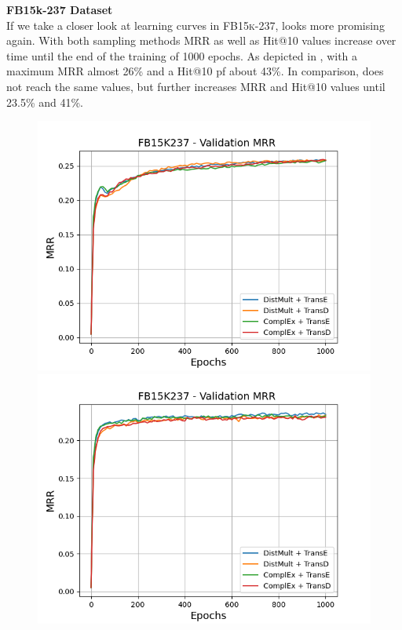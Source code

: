 \textbf{FB15k-237 Dataset}
\label{subsubsec:uncertainty_fb15k237}\\
%
If we take a closer look at learning curves in \textsc{FB15k-237}, \ussoftmax looks more promising again.
With both sampling methods MRR as well as Hit@10 values increase over time until the end of the training of 1000 epochs.
As depicted in , with \origsampling a maximum MRR almost 26\% and a Hit@10 pf about 43\%.
In comparison, \ussoftmax does not reach the same values, but further increases MRR and Hit@10 values until 23.5\% and 41\%.
\begin{figure}[H]
    \centering
    \begin{minipage}{.5\textwidth}
      \centering
      \includegraphics[width=0.9\linewidth]{figures/results/gan_train/not_pretrained/random/fb15k237/epochs1000/random_fb15k237_mrrs.png}
    \end{minipage}%
    \begin{minipage}{.5\textwidth}
      \centering
      \includegraphics[width=0.9\linewidth]{figures/results/gan_train/not_pretrained/uncertainty/max_distribution/entropy/fb15k237/1k_epochs/uncertainty_fb15k237_mrrs.png}

\end{minipage}
\end{figure}
